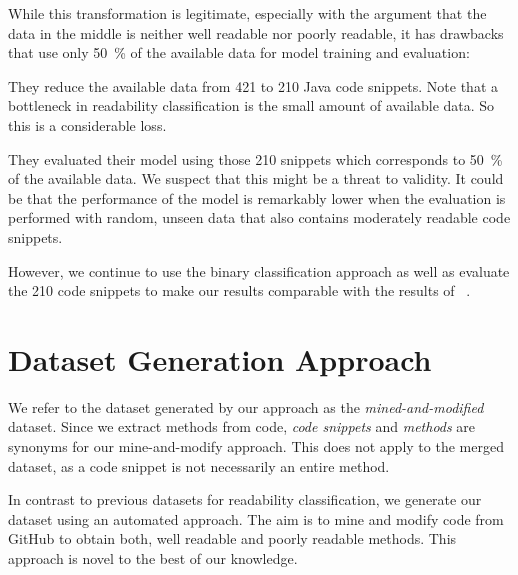 \documentclass[%
class=scrreprt,
chapterprefix=false,%
open=right,%
twoside=true,%
paper=a4,%
logofile={Logo\_zentral\_farbig\_EN.png},%
thesistype=master,%
UKenglish,%
]{se2thesis}
\theoremstyle{definition}
\begin{document}
	While this transformation is legitimate, especially with the argument that the data in the middle is neither well readable nor poorly readable, it has drawbacks that \citeauthor{mi2022towards} use only 50~\% of the available data for model training and evaluation:
	
	They reduce the available data from 421 to 210 Java code snippets. Note that a bottleneck in readability classification is the small amount of available data. So this is a considerable loss.
	
	They evaluated their model using those 210 snippets which corresponds to 50~\% of the available data. We suspect that this might be a threat to validity. It could be that the performance of the model is remarkably lower when the evaluation is performed with random, unseen data that also contains moderately readable code snippets.
	
	However, we continue to use the binary classification approach as well as evaluate the 210 code snippets to make our results comparable with the results of \citeauthor{mi2022towards}~\cite{mi2022towards}.
	
\section{Dataset Generation Approach} \label{Dataset Generation Approach}
	We refer to the dataset generated by our approach as the \textit{mined-and-modified} dataset.
	Since we extract methods from code, \textit{code snippets} and \textit{methods} are synonyms for our mine-and-modify approach. This does not apply to the merged dataset, as a code snippet is not necessarily an entire method.

	In contrast to previous datasets for readability classification, we generate our dataset using an automated approach. The aim is to mine and modify code from GitHub to obtain both, well readable and poorly readable methods. This approach is novel to the best of our knowledge. 
	
\end{document}
